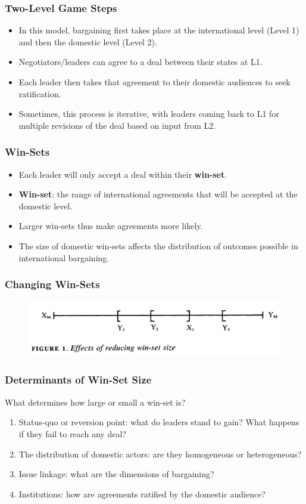 \documentclass[handout]{beamer}
\begin{document}
\begin{frame} 
\frametitle{\LARGE{Two-Level Game Steps}}
	\begin{itemize}
		\item In this model, bargaining first takes place at the international level (Level 1) and then the domestic level (Level 2). \pause
		\item Negotiators/leaders can agree to a deal between their states at L1. \pause
		\item Each leader then takes that agreement to their domestic audiences to seek ratification. \pause
		\item Sometimes, this process is iterative, with leaders coming back to L1 for multiple revisions of the deal based on input from L2.
	\end{itemize}
\end{frame}

\begin{frame} 
\frametitle{\LARGE{Win-Sets}}
	\begin{itemize}
		\item Each leader will only accept a deal within their \textbf{win-set}. \pause
		\item \textbf{Win-set}: the range of international agreements that will be accepted at the domestic level. \pause
		\item Larger win-sets thus make agreements more likely. \pause
		\item The size of domestic win-sets affects the distribution of outcomes possible in international bargaining.
	\end{itemize}
\end{frame}

\begin{frame} 
\frametitle{\LARGE{Changing Win-Sets}}
\begin{figure}[ht!]
	\centering
\includegraphics[width=\textwidth,height=0.8\textheight,keepaspectratio]{./winset.png}
\end{figure}
\end{frame}

\begin{frame} 
\frametitle{\LARGE{Determinants of Win-Set Size}}
 What determines how large or small a win-set is? \pause
	\begin{enumerate}
		\item Status-quo or reversion point: what do leaders stand to gain? What happens if they fail to reach any deal? \pause
		\item The distribution of domestic actors: are they homogeneous or heterogeneous?    \pause 
		\item Issue linkage: what are the dimensions of bargaining? \pause 
		\item Institutions: how are agreements ratified by the domestic audience?
	\end{enumerate}
\end{frame}
\end{document}
